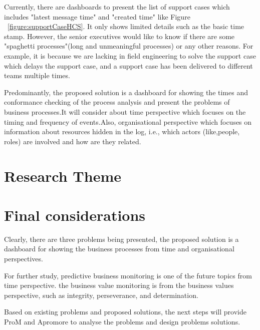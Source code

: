 Currently, there are dashboards to present the list of support cases which includes "latest message time" and "created time" like Figure ~\ref{figure:supportCaseHCS}. It only shows limited details such as the basic time stamp. However, the senior executives would like to know if there are some "spaghetti processes"(long and unmeaningful processes) or any other reasons. For example, it is because we are lacking in field engineering to solve the support case which delays the support case, and a support case has been delivered to different teams multiple times.

Predominantly, the proposed solution is a dashboard for showing the times  and conformance checking of the process  analysis and present the problems of business processes.It will consider about time perspective which focuses on the timing and frequency of events.Also, organisational perspective which focuses on information about resources hidden in the log, i.e., which actors (like,people, roles) are involved and how are they related.


\section{Research Theme}



\section{Final considerations} 

Clearly, there are three problems being presented, the proposed solution is a dashboard for showing the business processes from time and organisational perspectives.

For further study, predictive business monitoring is one of the future topics from time perspective. the business value monitoring is from the business values perspective, such as integrity, perseverance, and determination.

Based on existing problems and proposed solutions, the next steps will provide ProM and Apromore to analyse the problems and design problems solutions.